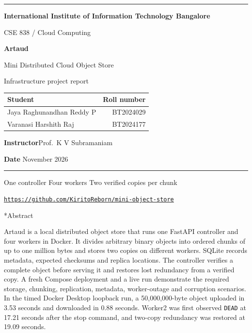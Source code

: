 \documentclass[11pt,a4paper]{article}
\makeatletter
\renewcommand{\section}{\@startsection{section}{1}{0pt}{-2.5ex plus -.4ex}{1.1ex}{\Large\sffamily\bfseries\color{ink}}}
\newcommand{\code}[1]{\texttt{#1}}
\newcommand{\repo}{https://github.com/KiritoReborn/mini-object-store}
\newcommand{\stoppedseconds}{17.21}
\newcommand{\repairedseconds}{19.09}
\newcommand{\uploadseconds}{3.53}
\newcommand{\downloadseconds}{0.88}
\makeatother
\begin{document}
\begin{titlepage}
\thispagestyle{empty}
{\color{forest}\rule{\linewidth}{1.4pt}}\par
\vspace{10mm}
{\large\sffamily\color{forest}\bfseries International Institute of Information Technology Bangalore}\par
{\large\sffamily\color{slate} CSE 838 / Cloud Computing}\par
\vspace{18mm}
{\Huge\sffamily\bfseries\color{ink} Artaud}\par
\vspace{2mm}
{\LARGE\sffamily\color{slate} Mini Distributed Cloud Object Store}\par
\vspace{6mm}
{\large\sffamily Infrastructure project report}\par
\vspace{13mm}

\begin{tabularx}{\linewidth}{@{}Y r@{}}
\toprule
\textbf{Student} & \textbf{Roll number} \\
\midrule
Jaya Raghunandhan Reddy P & BT2024029 \\
Varanasi Harshith Raj & BT2024177 \\
\bottomrule
\end{tabularx}

\vspace{8mm}
\textbf{Instructor}\enspace Prof.\ K V Subramaniam\par
\textbf{Date} November 2026\par
\vfill
{\color{linegreen}\rule{\linewidth}{.6pt}}\par
{\small\sffamily\color{slate}
One controller \enspace\textbullet\enspace Four workers \enspace\textbullet\enspace Two verified copies per chunk\par
\href{\repo}{\nolinkurl{https://github.com/KiritoReborn/mini-object-store}}}
\end{titlepage}
\setcounter{page}{2}

\section*{Abstract}
Artaud is a local distributed object store that runs one FastAPI controller and
four workers in Docker. It divides arbitrary binary objects into ordered chunks
of up to one million bytes and stores two copies on different workers. SQLite
records metadata, expected checksums and replica locations. The controller
verifies a complete object before serving it and restores lost redundancy from a
verified copy. A fresh Compose deployment and a live run demonstrate the
required storage, chunking, replication, metadata, worker-outage and corruption
scenarios. In the timed Docker Desktop loopback run, a 50,000,000-byte object
uploaded in \uploadseconds{} seconds and downloaded in \downloadseconds{} seconds.
Worker2 was first observed \code{DEAD} at \stoppedseconds{} seconds after the stop
command, and two-copy redundancy was restored at \repairedseconds{} seconds.
\end{document}

